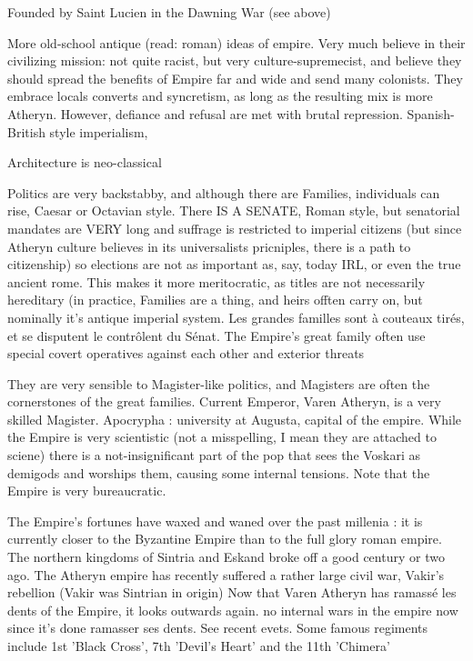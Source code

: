 Founded by Saint Lucien in the Dawning War (see above)

More old-school antique (read: roman) ideas of empire. Very much believe in their civilizing mission: not quite racist, but very culture-supremecist, and believe they should spread the benefits of Empire far and wide and send many colonists. They embrace locals converts and syncretism, as long as the resulting mix is more Atheryn. However, defiance and refusal are met with brutal repression. 
Spanish-British style imperialism, 

Architecture is neo-classical

Politics are very backstabby, and although there are Families, individuals can rise, Caesar or Octavian style. There IS A SENATE, Roman style, but senatorial mandates are VERY long and suffrage is restricted to imperial citizens (but since Atheryn culture believes in its universalists pricniples, there is a path to citizenship) so elections are not as important as, say, today IRL, or even the true ancient rome. This makes it more meritocratic, as titles are not necessarily hereditary (in practice, Families are a thing, and heirs offten carry on, but nominally it's antique imperial system. Les grandes familles sont à couteaux tirés, et se disputent le contrôlent du Sénat. The Empire's great family often use special covert operatives against each other and exterior threats 

They are very sensible to Magister-like politics, and Magisters are often the cornerstones of the great families. Current Emperor, Varen Atheryn, is a very skilled Magister. Apocrypha : university at Augusta, capital of the empire. While the Empire is very scientistic (not a misspelling, I mean they are attached to sciene) there is a not-insignificant part of the pop that sees the Voskari as demigods and worships them, causing some internal tensions.
Note that the Empire is very bureaucratic. 

The Empire's fortunes have waxed and waned over the past millenia : it is currently closer to the Byzantine Empire than to the full glory roman empire. The northern kingdoms of Sintria and Eskand broke off a good century or two ago. The Atheryn empire has recently suffered a rather large civil war, Vakir's rebellion (Vakir was Sintrian in origin) Now that Varen Atheryn has ramassé les dents of the Empire, it looks outwards again.  no internal wars in the empire now since it's done ramasser ses dents. See recent evets. Some famous regiments include 1st 'Black Cross', 7th 'Devil's Heart' and the 11th 'Chimera'


